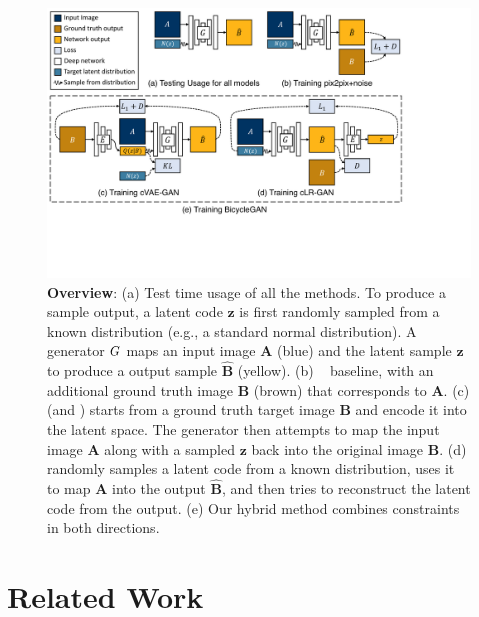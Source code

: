 \begin{figure}
  \centering
  \includegraphics[width=1.\linewidth]{imgs/fig2.pdf}
\caption{\small \textbf{Overview}: (a) Test time usage of all the methods. To produce a sample output, a latent code $\mathbf{z}$ is first randomly sampled from a known distribution (e.g., a standard normal distribution). A generator $G$ maps an input image $\mathbf{A}$ (blue) and the latent sample $\mathbf{z}$ to produce a output sample $\mathbf{\hat{B}}$ (yellow). (b) \ppn~\citep{isola2016image} baseline, with an additional ground truth image $\mathbf{B}$ (brown) that corresponds to $\mathbf{A}$. (c)  \cvaegan (and \cae) starts from a ground truth target image $\mathbf{B}$ and encode it into the latent space. The generator then attempts to map the input image $\mathbf{A}$ along with a sampled $\mathbf{z}$ back into the original image $\mathbf{B}$. (d) \cinfogan randomly samples a latent code from a known distribution, uses it to map $\mathbf{A}$ into the output $\mathbf{\hat{B}}$, and then tries to reconstruct the latent code from the output. (e) Our hybrid \bicycle method combines constraints in both directions.
}
\vspace{-5mm}
\label{fig:fig2}
\end{figure}

\section{Related Work}


